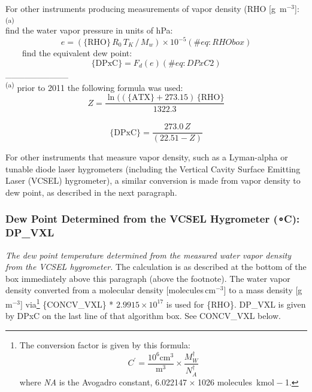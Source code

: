 \documentclass[
  english,
]{book}
\begin{document}
For other instruments producing measurements of vapor density (RHO
{[}g~m\(^{-3}\){]}:\textsuperscript{(a)}\\
\hspace*{0.333em}\hspace*{0.333em}\hspace*{0.333em}\hspace*{0.333em}find
the water vapor pressure in units of hPa: \begin{equation}
e = (\mathrm{\{RHO\}}\,R_{0}\,T_{K}\,/\,M_{w})\times 10^{-5}
(\#eq:RHObox)
\end{equation} ~~~~find the equivalent dew point:\\
\begin{equation}
\mathrm{\{DPxC\}} = F_{d}(e)
(\#eq:DPxC2)
\end{equation} \_\_\_\_\_\_\_\_\_\_\\
\textsuperscript{(a)} prior to 2011 the following formula was used:
\[Z=\frac{\ln((\mathrm{\{ATX\}}+273.15)\,\mathrm{\{RHO\}}}{1322.3}\]\\
\[\mathrm{\{DPxC\}}=\frac{273.0\,Z}{(22.51-Z)}\]

For other instruments that measure vapor density, such as a Lyman-alpha
or tunable diode laser hygrometers (including the Vertical Cavity
Surface Emitting Laser (VCSEL) hygrometer), a similar conversion is made
from vapor density to dew point, as described in the next paragraph.

\hypertarget{vcsel-dp}{%
\subsubsection*{\texorpdfstring{Dew Point Determined from the VCSEL
Hygrometer ({∘}C):
DP\_VXL}{Dew Point Determined from the VCSEL Hygrometer (∘C): DP\_VXL}}\label{vcsel-dp}}

\emph{The dew point temperature determined from the measured water vapor
density from the VCSEL hygrometer.} The calculation is as described at
the bottom of the box immediately above this paragraph (above the
footnote). The water vapor density converted from a molecular density
{[}molecules\(\,\)cm\(^{-3}\){]} to a mass density
{[}g\(\,\)m\(^{-3}\){]} via\footnote{The conversion factor is given by
  this formula:
  {\[C^{\prime}=\frac{10^{6}\mathrm{cm}^{3}}{\mathrm{m}^{3}}\times\frac{M_{W}^{\dagger}}{N_{A}^{\dagger}}\]}
  where {\emph{N}\emph{A}} is the Avogadro constant, 6.022147{ × 1026}
  molecules~kmol{ − 1}.} \{CONCV\_VXL\} * \(2.9915\times 10^{17}\) is
used for \{RHO\}. DP\_VXL is given by DPxC on the last line of that
algorithm box. See CONCV\_VXL below.
\end{document}
